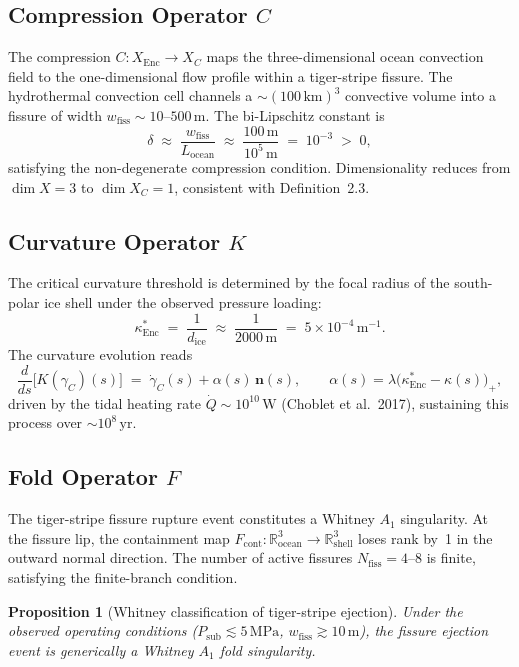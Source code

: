 \documentclass[12pt]{article}
\numberwithin{equation}{section}
\newtheorem{proposition}[theorem]{Proposition}
\theoremstyle{remark}
\newcommand{\R}{\mathbb{R}}
\begin{document}
\subsection{Compression Operator $C$}

The compression $C:X_{\mathrm{Enc}}\to X_C$ maps the three-dimensional ocean
convection field to the one-dimensional flow profile within a tiger-stripe fissure.
The hydrothermal convection cell channels a ${\sim}(100\,\mathrm{km})^3$ convective
volume into a fissure of width $w_{\mathrm{fiss}}\sim 10\text{--}500\,\mathrm{m}$.
The bi-Lipschitz constant is
\[
  \delta \;\approx\; \frac{w_{\mathrm{fiss}}}{L_{\mathrm{ocean}}}
  \;\approx\; \frac{100\,\mathrm{m}}{10^5\,\mathrm{m}} \;=\; 10^{-3} \;>\; 0,
\]
satisfying the non-degenerate compression condition. Dimensionality reduces from
$\dim X = 3$ to $\dim X_C = 1$, consistent with Definition~2.3.

\subsection{Curvature Operator $K$}

The critical curvature threshold is determined by the focal radius of the
south-polar ice shell under the observed pressure loading:
\[
  \kappa^*_{\mathrm{Enc}} \;=\; \frac{1}{d_{\mathrm{ice}}}
  \;\approx\; \frac{1}{2000\,\mathrm{m}} \;=\; 5\times 10^{-4}\,\mathrm{m}^{-1}.
\]
The curvature evolution reads
\[
  \frac{d}{ds}\bigl[K(\gamma_C)(s)\bigr] \;=\;
  \dot{\gamma}_C(s) + \alpha(s)\,\mathbf{n}(s),\qquad
  \alpha(s) = \lambda\bigl(\kappa^*_{\mathrm{Enc}} - \kappa(s)\bigr)_+,
\]
driven by the tidal heating rate $\dot{Q}\sim 10^{10}\,\mathrm{W}$ (Choblet et al.\
2017), sustaining this process over ${\sim}10^8\,\mathrm{yr}$.

\subsection{Fold Operator $F$}

The tiger-stripe fissure rupture event constitutes a Whitney $A_1$ singularity.
At the fissure lip, the containment map $F_{\mathrm{cont}}:\R^3_{\mathrm{ocean}}
\to\R^3_{\mathrm{shell}}$ loses rank by~1 in the outward normal direction.
The number of active fissures $N_{\mathrm{fiss}} = 4\text{--}8$ is finite,
satisfying the finite-branch condition.

\begin{proposition}[Whitney classification of tiger-stripe ejection]
\label{prop:whitney}
Under the observed operating conditions ($P_{\mathrm{sub}}\lesssim 5\,\mathrm{MPa}$,
$w_{\mathrm{fiss}}\gtrsim 10\,\mathrm{m}$), the fissure ejection event is
generically a Whitney $A_1$ fold singularity.
\end{proposition}
\end{document}
